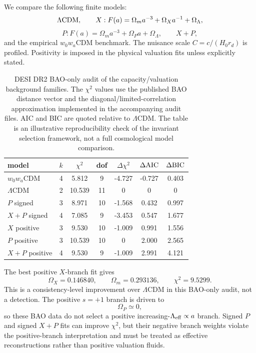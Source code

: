 \documentclass[aps,prd,reprint,nofootinbib,superscriptaddress,floatfix]{revtex4-2}
\numberwithin{equation}{section}
\theoremstyle{definition}
\theoremstyle{plain}
\begin{document}
We compare the following finite models:
\[
\Lambda{\rm CDM},\qquad
X:{F(a)=\Omega_m a^{-3}+\Omega_Xa^{-1}+\Omega_\Lambda},
\]
\[
P:{F(a)=\Omega_m a^{-3}+\Omega_Pa+\Omega_\Lambda},
\qquad
X+P,
\]
and the empirical \(w_0w_a\)CDM benchmark.  The nuisance scale \(C=c/(H_0r_d)\) is profiled.  Positivity is imposed in the physical valuation fits unless explicitly stated.

\begin{table}[t]
\caption{DESI DR2 BAO-only audit of the capacity/valuation background families.  The \(\chi^2\) values use the published BAO distance vector and the diagonal/limited-correlation approximation implemented in the accompanying audit files.  AIC and BIC are quoted relative to \(\Lambda\)CDM.  The table is an illustrative reproducibility check of the invariant selection framework, not a full cosmological model comparison.}
\label{tab:bao-audit}
\begin{ruledtabular}
\begin{tabular}{lcccccc}
model & \(k\) & \(\chi^2\) & dof & \(\Delta\chi^2\) & \(\Delta{\rm AIC}\) & \(\Delta{\rm BIC}\)\\
\hline
\(w_0w_a\)CDM & 4 & 5.812 & 9 & -4.727 & -0.727 & 0.403\\
\(\Lambda\)CDM & 2 & 10.539 & 11 & 0 & 0 & 0\\
\(P\) signed & 3 & 8.971 & 10 & -1.568 & 0.432 & 0.997\\
\(X+P\) signed & 4 & 7.085 & 9 & -3.453 & 0.547 & 1.677\\
\(X\) positive & 3 & 9.530 & 10 & -1.009 & 0.991 & 1.556\\
\(P\) positive & 3 & 10.539 & 10 & 0 & 2.000 & 2.565\\
\(X+P\) positive & 4 & 9.530 & 9 & -1.009 & 2.991 & 4.121
\end{tabular}
\end{ruledtabular}
\end{table}

The best positive \(X\)-branch fit gives
\[
\boxed{
\Omega_X=0.146840,\qquad
\Omega_m=0.293136,\qquad
\chi^2=9.5299.
}
\]
This is a consistency-level improvement over \(\Lambda\)CDM in this BAO-only audit, not a detection.  The positive \(s=+1\) branch is driven to
\[
\boxed{\Omega_P\simeq0,}
\]
so these BAO data do not select a positive increasing-\(\Lambda_{\rm eff}\propto a\) branch.  Signed \(P\) and signed \(X+P\) fits can improve \(\chi^2\), but their negative branch weights violate the positive-branch interpretation and must be treated as effective reconstructions rather than positive valuation fluids.
\end{document}
